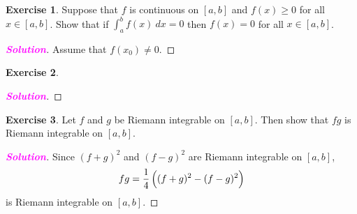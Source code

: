 \documentclass[12pt,openany]{book}
\theoremstyle{definition}
\newtheorem{exercise}{Exercise}[chapter]
\newcommand{\sol}{\textcolor{magenta}{\bf Solution}}
\begin{document}
	\vspace{15pt}
	\begin{tcolorbox}[colframe=execolor, title={\color{white}\bf}]
		\begin{exercise}
			Suppose that $f$ is continuous on $[a,b]$ and $f(x)\geq 0$ for all $x\in[a,b]$. Show that if $\int_a^bf(x)\ dx = 0$ then $f(x)=0$ for all $x\in[a,b]$.
		\end{exercise}
	\end{tcolorbox}
	\begin{proof}[\sol]
		Assume that $f(x_0)\neq 0$.
	\end{proof}
	\vspace{15pt}
	\begin{tcolorbox}[colframe=execolor, title={\color{white}\bf}]
		\begin{exercise}
			
		\end{exercise}
	\end{tcolorbox}
	\begin{proof}[\sol]
		
	\end{proof}
	\vspace{15pt}
	\begin{tcolorbox}[colframe=execolor, title={\color{white}\bf}]
		\begin{exercise}
			Let $f$ and $g$ be Riemann integrable on $[a,b]$. Then show that $fg$ is Riemann integrable on $[a,b]$.
		\end{exercise}
	\end{tcolorbox}
	\begin{proof}[\sol]
		Since $(f+g)^2$ and $(f-g)^2$ are Riemann integrable on $[a,b]$, \[
		fg=\frac{1}{4}\del{(f+g)^2-(f-g)^2}
		\] is Riemann integrable on $[a,b]$.
	\end{proof}


\end{document}
